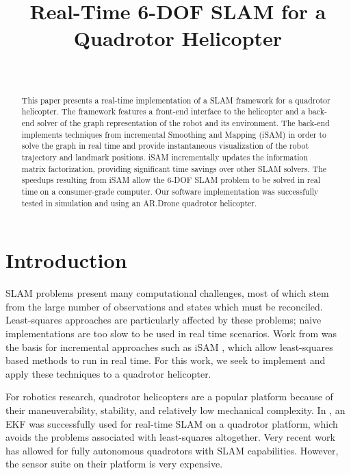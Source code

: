 \documentclass[conference]{IEEEtran}
\title{Real-Time 6-DOF SLAM for a Quadrotor Helicopter}
\author{\IEEEauthorblockN{Stephen Chaves\ \ \ \ \  Schuyler Cohen\ \ \ \ \  Patrick
     O'Keefe\ \ \ \ \  Paul Ozog}\\
   \IEEEauthorblockA{University of Michigan}
}
\begin{document}
\maketitle



\begin{abstract}

  This paper presents a real-time implementation of a \ac{SLAM} framework for a quadrotor
  helicopter.  The framework features a front-end interface to the helicopter and a
  back-end solver of the graph representation of the robot and its environment. The
  back-end implements techniques from incremental Smoothing and Mapping (iSAM) in order to
  solve the graph in real time and provide instantaneous visualization of the robot
  trajectory and landmark positions. iSAM incrementally updates the information matrix
  factorization, providing significant time savings over other \ac{SLAM} solvers. The speedups
  resulting from iSAM allow the 6-\ac{DOF} \ac{SLAM} problem to be solved in real time on a
  consumer-grade computer. Our software implementation was successfully tested in simulation
  and using an AR.Drone quadrotor helicopter.

\end{abstract}






\section{Introduction}
\label{sec:introduction}


\ac{SLAM} problems present many computational challenges, most of which stem from the
large number of observations and states which must be reconciled. Least-squares approaches
are particularly affected by these problems; naive implementations are too slow to be used
in real time scenarios. Work from \cite{dellaert2005square} was the basis for incremental
approaches such as iSAM \cite{Kaess08tro}, which allow least-squares based methods to run
in real time. For this work, we seek to implement and apply these techniques to a quadrotor
helicopter.


For robotics research, quadrotor helicopters are a popular platform because of their
maneuverability, stability, and relatively low mechanical complexity. In
\cite{achtelik2008autonomous}, an \ac{EKF} was successfully used for real-time \ac{SLAM} on
a quadrotor platform, which avoids the problems associated with least-squares altogether. Very
recent work \cite{ghadiok2011autonomous} has allowed for fully autonomous quadrotors with
SLAM capabilities. However, the sensor suite on their platform is very expensive.
\end{document}
